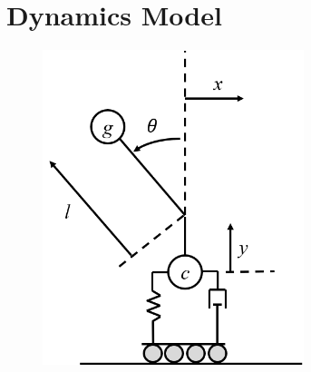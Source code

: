 \documentclass{amsart}
\numberwithin{equation}{section}
\begin{document}
\section{Dynamics Model}
\begin{figure}
\includegraphics[width=3in]{diagram.png}
\end{figure}
\end{document}
